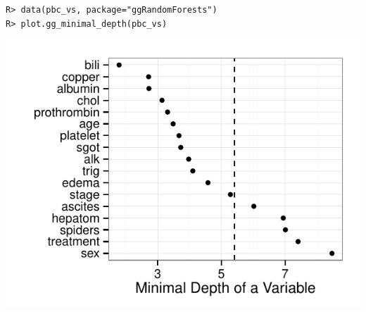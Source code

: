 \documentclass[nojss,letterpaper]{jss}\usepackage[]{graphicx}\usepackage[]{color}
\makeatletter
\def\maxwidth{ %
  \ifdim\Gin@nat@width>\linewidth
    \linewidth
  \else
    \Gin@nat@width
  \fi
}
\newenvironment{kframe}{%
 \def\at@end@of@kframe{}%
 \ifinner\ifhmode%
  \def\at@end@of@kframe{\end{minipage}}%
  \begin{minipage}{\columnwidth}%
 \fi\fi%
 \def\FrameCommand##1{\hskip\@totalleftmargin \hskip-\fboxsep
 \colorbox{shadecolor}{##1}\hskip-\fboxsep
     \hskip-\linewidth \hskip-\@totalleftmargin \hskip\columnwidth}%
 \MakeFramed {\advance\hsize-\width
   \@totalleftmargin\z@ \linewidth\hsize
   \@setminipage}}%
 {\par\unskip\endMakeFramed%
 \at@end@of@kframe}
\newenvironment{knitrout}{}{} %
\makeatother
\begin{document}
\begin{knitrout}\footnotesize
{}\color{fgcolor}\begin{kframe}
\begin{verbatim}
R> data(pbc_vs, package="ggRandomForests")
R> plot.gg_minimal_depth(pbc_vs)
\end{verbatim}
\end{kframe}

{\centering \includegraphics[width=\maxwidth]{figure/vig-pbc-mindepth-1} 

}



\end{knitrout}
\end{document}
